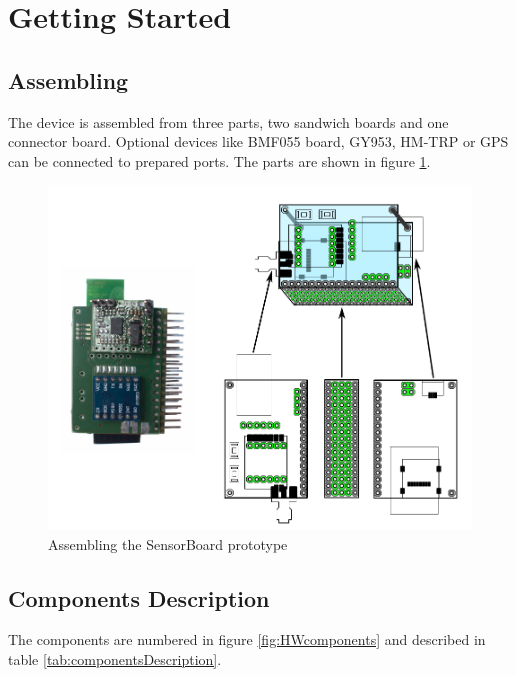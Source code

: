 \section{Getting Started}

\subsection{Assembling}
The device is assembled from three parts, two sandwich boards and one connector board. Optional devices like BMF055 board, GY953, HM-TRP or GPS can be connected to prepared ports. The parts are shown in figure \ref{fig:HWassembling}.

\begin{figure}[H]
	\centering
	\includegraphics[scale=1]{img/assemblingHW.pdf}
	\caption{Assembling the SensorBoard prototype}
	\label{fig:HWassembling}
\end{figure}

\subsection{Components Description}
The components are numbered in figure \ref{fig:HWcomponents} and described in table \ref{tab:componentsDescription}.


